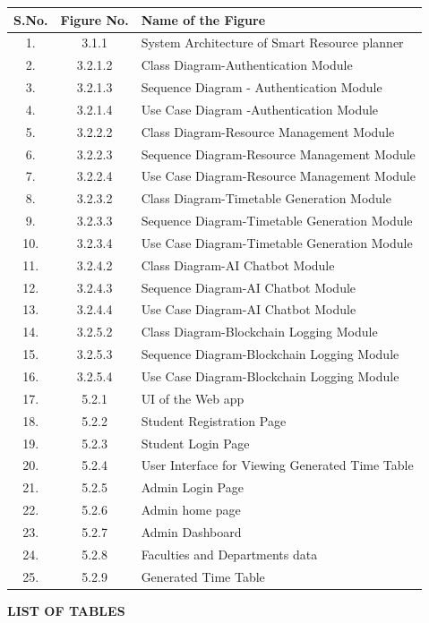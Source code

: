 \documentclass[a4paper, 12pt]{report}
\begin{document}
\begin{center}
\renewcommand{\arraystretch}{1.2}

\begin{tabular}{|c|c|p{12cm}|}
\hline
\textbf{S.No.} & \textbf{Figure No.} & \textbf{Name of the Figure} \\
\hline

1. & 3.1.1 & System Architecture of Smart Resource planner \\ \hline
2. & 3.2.1.2 & Class Diagram-Authentication Module\\ \hline
3. & 3.2.1.3 & Sequence Diagram - Authentication Module \\ \hline
4. & 3.2.1.4 & Use Case Diagram -Authentication Module \\ \hline
5. & 3.2.2.2 & Class Diagram-Resource Management Module \\ \hline
6. & 3.2.2.3 & Sequence Diagram-Resource Management Module \\ \hline
7. & 3.2.2.4 & Use Case Diagram-Resource Management Module\\ \hline
8. & 3.2.3.2 & Class Diagram-Timetable Generation Module \\ \hline
9. & 3.2.3.3 & Sequence Diagram-Timetable Generation Module \\ \hline
10. & 3.2.3.4 & Use Case Diagram-Timetable Generation Module \\ \hline
11. & 3.2.4.2 & Class Diagram-AI Chatbot Module \\ \hline
12. & 3.2.4.3 & Sequence Diagram-AI Chatbot Module \\ \hline
13. & 3.2.4.4 & Use Case Diagram-AI Chatbot Module \\ \hline
14. & 3.2.5.2 & Class Diagram-Blockchain Logging Module \\ \hline
15. & 3.2.5.3 & Sequence Diagram-Blockchain Logging Module \\ \hline
16. & 3.2.5.4 & Use Case Diagram-Blockchain Logging Module \\ \hline
17. & 5.2.1 & UI of the Web app \\ \hline
18. & 5.2.2 & Student Registration Page \\ \hline
19. & 5.2.3& Student Login Page \\ \hline
20. & 5.2.4 & User Interface for Viewing Generated Time Table \\ \hline
21. & 5.2.5 & Admin Login Page \\ \hline
22. & 5.2.6 & Admin home page \\ \hline
23. & 5.2.7 & Admin Dashboard \\ \hline
24. & 5.2.8 & Faculties and Departments data \\ \hline
25. & 5.2.9 & Generated Time Table \\ \hline

\end{tabular}
\end{center}
{\textbf{LIST OF TABLES}}
\end{document}
